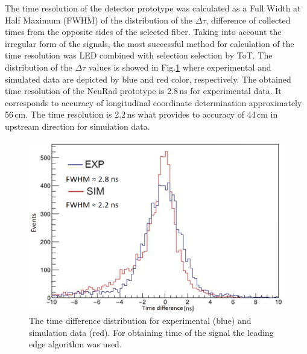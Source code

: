 \documentclass{webofc}
\begin{document}
	The time resolution of the detector prototype was calculated as a Full Width at Half Maximum (FWHM) of the distribution of the $\Delta \tau$, difference of collected times from the opposite sides of the selected fiber.
%
%
	Taking into account the irregular form of the signals, the most successful method for calculation of the time resolution was LED combined with selection selection  by ToT.
	The distribution of the $\Delta \tau$ values is showed in Fig.\ref{ris:tausim} where experimental and simulated data are depicted by blue and red color, respectively.
	The obtained time resolution of the NeuRad prototype is 2.8\,ns for experimental data. It corresponds to accuracy of longitudinal coordinate determination approximately 56\,cm. The time resolution is 2.2\,ns what provides to accuracy of 44\,cm in upstream direction for simulation data.
	
	\begin{figure}[h]
		\centering
		\includegraphics[width=0.8\linewidth]{tausim.png}
		\caption{The time difference distribution for experimental (blue) and simulation data (red). For obtaining time of the signal the leading edge algorithm was used.}\label{ris:tausim}
	\end{figure}
	
	
	

\end{document}
